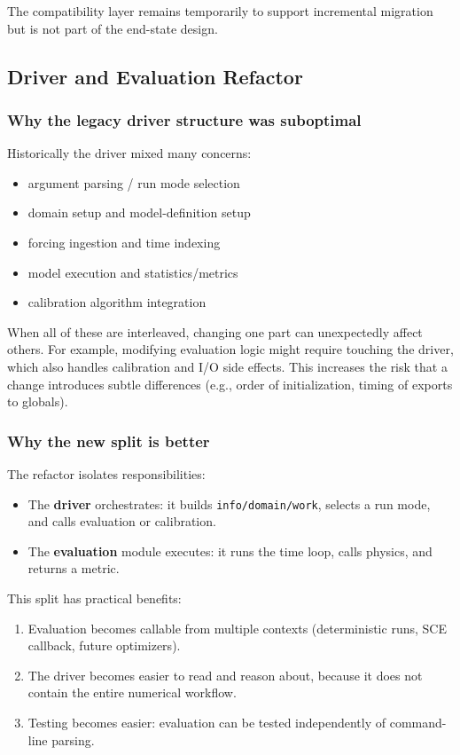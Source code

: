 \documentclass[11pt]{scrartcl}
\begin{document}
The compatibility layer remains temporarily to support incremental migration but is not
part of the end-state design.

\subsection{Driver and Evaluation Refactor}

\subsubsection{Why the legacy driver structure was suboptimal}

Historically the driver mixed many concerns:
\begin{itemize}[leftmargin=*]
\item argument parsing / run mode selection
\item domain setup and model-definition setup
\item forcing ingestion and time indexing
\item model execution and statistics/metrics
\item calibration algorithm integration
\end{itemize}

When all of these are interleaved, changing one part can unexpectedly affect others.
For example, modifying evaluation logic might require touching the driver, which
also handles calibration and I/O side effects. This increases the risk that a change
introduces subtle differences (e.g., order of initialization, timing of exports to globals).

\subsubsection{Why the new split is better}

The refactor isolates responsibilities:
\begin{itemize}[leftmargin=*]
\item The \textbf{driver} orchestrates: it builds \texttt{info/domain/work}, selects a run mode,
      and calls evaluation or calibration.
\item The \textbf{evaluation} module executes: it runs the time loop, calls physics, and returns a metric.
\end{itemize}

This split has practical benefits:
\begin{enumerate}[leftmargin=*]
\item Evaluation becomes callable from multiple contexts (deterministic runs, SCE callback, future optimizers).
\item The driver becomes easier to read and reason about, because it does not contain the entire numerical workflow.
\item Testing becomes easier: evaluation can be tested independently of command-line parsing.
\end{enumerate}
\end{document}
